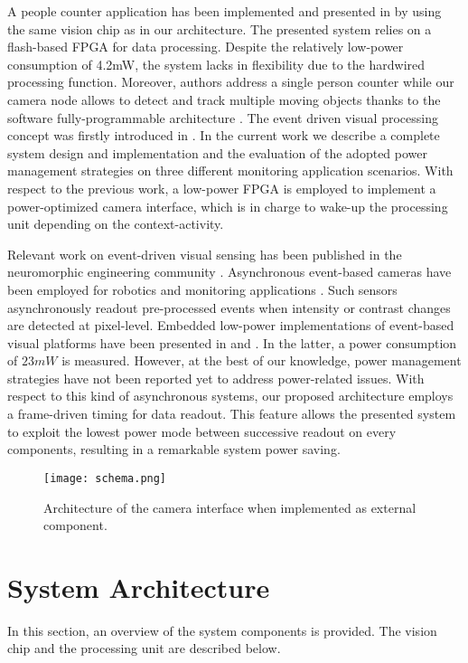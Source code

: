 \documentclass[journal]{IEEEtran}
\begin{document}
A people counter application has been implemented and presented in \cite{Gasparini2011} by using the same vision chip as in our architecture. 
The presented system relies on a flash-based FPGA for data processing.
Despite the relatively low-power consumption of 4.2mW, the system lacks in flexibility due to the hardwired processing function. Moreover, authors address a single person counter while our camera node allows to detect and track multiple moving objects thanks to the software fully-programmable architecture \cite{RusciISC2}. 
The event driven visual processing concept was firstly introduced in \cite{Rusci2016}. In the current work we describe a complete system design and implementation and the evaluation of the adopted power management strategies on three different monitoring application scenarios. With respect to the previous work, a low-power FPGA is employed to implement a power-optimized camera interface, which is in charge to wake-up the processing unit depending on the context-activity. 


Relevant work on event-driven visual sensing has been published in the neuromorphic engineering community \cite{Posch2014}. Asynchronous event-based cameras \cite{Delbruck2008,Lichtsteiner2008,Lenero} have been employed for robotics \cite{Delbruck2015} and monitoring applications \cite{Litzenberger2006}. Such sensors asynchronously readout pre-processed events when intensity or contrast changes are detected at pixel-level.  
Embedded low-power implementations of event-based visual platforms have been presented in \cite{Litzenberger2006} and \cite{Muller2011}. In the latter, a power consumption of $23mW$ is measured. However, at the best of our knowledge, power management strategies have not been reported yet to address power-related issues. 
With respect to this kind of asynchronous systems, our proposed architecture employs a frame-driven timing for data readout. This feature allows the presented system to exploit the lowest power mode between successive readout on every components, resulting in a remarkable system power saving.




\begin{figure*}[t]
	\centering
  	\texttt{[image: schema.png]}
	\caption{Architecture of the camera interface when implemented as external component.}
	\label{fig:archi}       %
\end{figure*}
\section{System Architecture}
\label{sec:SysArc}
In this section, an overview of the system components is provided. The vision chip and the processing unit are described below.
\end{document}
